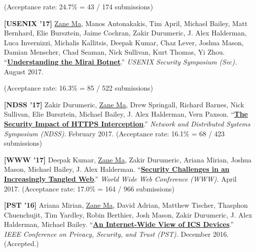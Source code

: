 \documentclass[10pt,singlecolumn]{article} %
\begin{document}
\begin{etaremune}
(Acceptance rate: 24.7\% = 43 / 174 submissions)
\vspace{6pt}


\item \textbf{[USENIX '17]}
\underline{Zane Ma}, Manos Antonakakis, Tim April, Michael Bailey, Matt Bernhard, Elie Bursztein, Jaime Cochran, Zakir Durumeric, J. Alex Halderman, Luca Invernizzi, Michalis Kallitsis, Deepak Kumar, Chaz Lever, Joshua Mason, Damian Menscher, Chad Seaman, Nick Sullivan, Kurt Thomas, Yi Zhou.
``\textbf{\href{https://zanema.com/papers/usenix17_mirai.pdf}{Understanding the Mirai Botnet}}.''
\emph{USENIX Security Symposium (Sec).} August 2017.

(Acceptance rate: 16.3\% = 85 / 522 submissions)
\vspace{6pt}


\item \textbf{[NDSS '17]}
Zakir Durumeric, \underline{Zane Ma}, Drew Springall, Richard Barnes, Nick Sullivan, Elie Bursztein, Michael Bailey, J. Alex Halderman, Vern Paxson.
``\textbf{\href{https://zanema.com/papers/ndss17_interception.pdf}{The Security Impact of HTTPS Interception}}.''
\emph{Network and Distributed Systems Symposium (NDSS).} February 2017.
(Acceptance rate: 16.1\% = 68 / 423 submissions)
\vspace{6pt}


\item \textbf{[WWW '17]}
Deepak Kumar, \underline{Zane Ma}, Zakir Durumeric, Ariana Mirian, Joshua Mason, Michael Bailey, J. Alex Halderman.
``\textbf{\href{https://zanema.com/papers/www17_tangled.pdf}{Security Challenges in an Increasingly Tangled Web}}.''
\emph{World Wide Web Conference (WWW).} April 2017.
(Acceptance rate: 17.0\% = 164 / 966 submissions)
\vspace{6pt}


\item \textbf{[PST '16]}
Ariana Mirian, \underline{Zane Ma}, David Adrian, Matthew Tischer, Thasphon Chuenchujit, Tim Yardley, Robin Berthier, Josh Mason, Zakir Durumeric, J. Alex Halderman, Michael Bailey.
``\textbf{\href{https://zanema.com/papers/pst16_ics.pdf}{An Internet-Wide View of ICS Devices}}.''
\emph{IEEE Conference on Privacy, Security, and Trust (PST).} December 2016. (Accepted.)
\vspace{6pt}

\end{etaremune}
\end{document}
